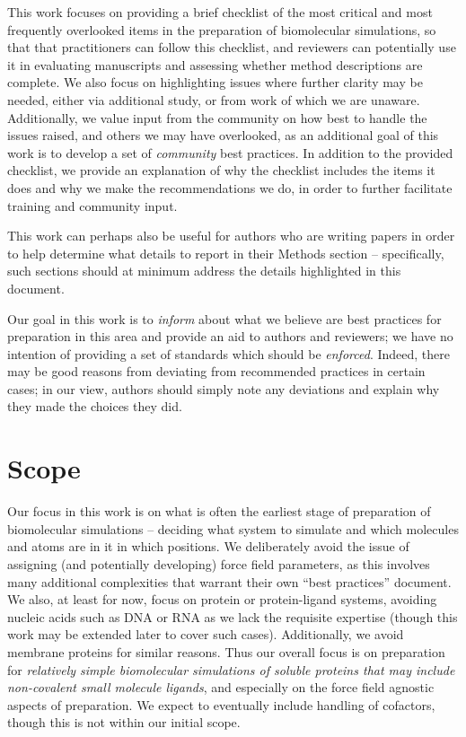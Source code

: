 \documentclass[9pt,bestpractices]{livecoms}
\begin{document}
This work focuses on providing a brief checklist of the most critical and most frequently overlooked items in the preparation of biomolecular simulations, so that that practitioners can follow this checklist, and reviewers can potentially use it in evaluating manuscripts and assessing whether method descriptions are complete. 
We also focus on highlighting issues where further clarity may be needed, either via additional study, or from work of which we are unaware.
Additionally, we value input from the community on how best to handle the issues raised, and others we may have overlooked, as an additional goal of this work is to develop a set of \emph{community} best practices.
In addition to the provided checklist, we provide an explanation of why the checklist includes the items it does and why we make the recommendations we do, in order to further facilitate training and community input.

This work can perhaps also be useful for authors who are writing papers in order to help determine what details to report in their Methods section -- specifically, such sections should at minimum address the details highlighted in this document. 

Our goal in this work is to \emph{inform} about what we believe are best practices for preparation in this area and provide an aid to authors and reviewers; we have no intention of providing a set of standards which should be \emph{enforced}. 
Indeed, there may be good reasons from deviating from recommended practices in certain cases; in our view, authors should simply note any deviations and explain why they made the choices they did. 

\section{Scope}

Our focus in this work is on what is often the earliest stage of preparation of biomolecular simulations -- deciding what system to simulate and which molecules and atoms are in it in which positions. 
We deliberately avoid the issue of assigning (and potentially developing) force field parameters, as this involves many additional complexities that warrant their own ``best practices'' document.
We also, at least for now, focus on protein or protein-ligand systems, avoiding nucleic acids such as DNA or RNA as we lack the requisite expertise (though this work may be extended later to cover such cases). 
Additionally, we avoid membrane proteins for similar reasons.
Thus our overall focus is on preparation for \emph{relatively simple biomolecular simulations of soluble proteins that may include non-covalent small molecule ligands}, and especially on the force field agnostic aspects of preparation.
We expect to eventually include handling of cofactors, though this is not within our initial scope.
\end{document}
